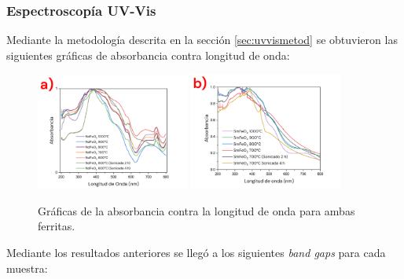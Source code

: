 \documentclass[../main.tex]{subfiles}
\begin{document}
\subsubsection{Espectroscopía UV-Vis}
Mediante la metodología descrita en la sección \ref{sec:uvvismetod} se obtuvieron las siguientes gráficas de absorbancia contra longitud de onda:
\begin{figure}[H]
    \centering
    \includegraphics[width=0.45\textwidth]{fig/absorbancianeod.png}
    \quad
    \includegraphics[width=0.45\textwidth]{fig/absorbanciasama.png}
    \caption{Gráficas de la absorbancia contra la longitud de onda para ambas ferritas.}
    \label{fig:absorbres}
\end{figure}
Mediante los resultados anteriores se llegó a los siguientes \textit{band gaps} para cada muestra:
\end{document}
